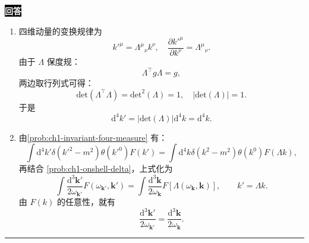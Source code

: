 \documentclass[11pt,a4paper]{ctexart}
\newenvironment{answer}
  {\par\smallskip\noindent
   \begingroup
   \setlength{\fboxsep}{4pt}%
   \colorbox{black}{\textcolor{white}{\bfseries 回答}}%
   \endgroup
   \quad\ignorespaces}
  {\par\smallskip\noindent\rule{\linewidth}{0.4pt}\medskip}
\begin{document}
\begin{answer}
\begin{enumerate}[label=(1.3.\arabic*),ref=1.3.\arabic*,leftmargin=4.5em]
\begin{equation}
\begin{aligned}
        =&\int_{-\infty}^{+\infty}\mathrm{d}k^0 \left[\frac{\delta\left(k^0+\sqrt{\bm{k}^2+m^2} \right) }{2\sqrt{\bm{k}^2+m^2} } + \frac{\delta\left(k^0-\sqrt{\bm{k}^2+m^2} \right) }{2\sqrt{\bm{k}^2+m^2} }  \right] \theta\left(k^0 \right) \\
        =&\int_{-\infty}^{+\infty}\mathrm{d}k^0 \frac{\delta\left(k^0-\sqrt{\bm{k}^2+m^2} \right) }{2\sqrt{\bm{k}^2+m^2} }
        =\frac{1 }{2\sqrt{\bm{k}^2+m^2} } \\
        =&\frac{1 }{2\omega_{\bm{k}} }. 
      \end{aligned}
    \end{equation}
    \item 四维动量的变换规律为
    \begin{equation}
      k'^\mu = \Lambda^\mu{}_{\nu} k^\nu,\quad
      \frac{\partial k'^\mu}{\partial k^\nu}
      =\Lambda^\mu{}_\nu.
    \end{equation}
    由于 $\Lambda $ 保度规：
    \begin{equation}
      \Lambda^\top g \Lambda = g,
    \end{equation}
    两边取行列式可得：
    \begin{equation}
      \mathrm{det}\left(\Lambda^\top \Lambda \right)
      =\mathrm{det}^2\left(\Lambda \right)
      =1,\quad
      \left|\mathrm{det}\left(\Lambda \right) \right|
      =1.
    \end{equation}
    于是
    \begin{equation}
      \mathrm{d}^4k'
      =\left|\mathrm{det}\left(\Lambda \right) \right|\mathrm{d}^4k
      =\mathrm{d}^4k.
    \end{equation}
    \item 由\ref{prob:ch1-invariant-four-measure} 有：
    \begin{equation}
      \int \mathrm{d}^4k' \delta\left(k'^2-m^2 \right) \theta\left(k'^0 \right) F(k')
      =\int \mathrm{d}^4k \delta\left(k^2-m^2 \right) \theta\left(k^0 \right) F(\Lambda k),
    \end{equation}
    再结合 \ref{prob:ch1-onshell-delta}，上式化为
    \begin{equation}
      \int\frac{\mathrm{d}^3\bm{k}' }{2\omega_{\bm{k}'} } F(\omega_{\bm{k}'},\bm{k}')
      =\int \frac{\mathrm{d}^3\bm{k} }{2\omega_{\bm{k}} } F\left[\Lambda\left(\omega_{\bm{k}},\bm{k} \right) \right],\qquad
      k'=\Lambda k.
    \end{equation}
    由 $F(k) $ 的任意性，就有
    \begin{equation}
      \frac{\mathrm{d}^3\bm{k}'}{2\omega_{\bm{k}'}}
      =\frac{\mathrm{d}^3\bm{k}}{2\omega_{\bm{k}}}.
    \end{equation}
  \end{enumerate}
\end{answer}
\end{document}
